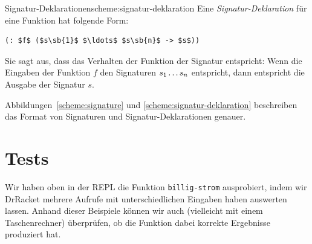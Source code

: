 \begin{feature}{Signatur-Deklarationen}{scheme:signatur-deklaration}
Eine \textit{Signatur-Deklaration} für
eine Funktion hat
folgende Form:
%
\begin{lstlisting}
(: $f$ ($s\sb{1}$ $\ldots$ $s\sb{n}$ -> $s$))
\end{lstlisting}
%
Sie sagt aus, dass das Verhalten der Funktion der Signatur entspricht:
Wenn die Eingaben der Funktion $f$ den Signaturen \(s\sb{1} \ldots
s\sb{n}\) entspricht, dann entspricht die Ausgabe der Signatur $s$.
\end{feature}
%
Abbildungen~\ref{scheme:signature} und
\ref{scheme:signatur-deklaration} beschreiben das Format von Signaturen
und Signatur-Deklarationen genauer.

\section{Tests}

Wir haben oben in der REPL die Funktion
\lstinline{billig-strom} ausprobiert, indem wir DrRacket mehrere Aufrufe
mit unterschiedlichen Eingaben haben auswerten lassen.  Anhand dieser
Beispiele können wir auch (vielleicht mit einem Taschenrechner)
überprüfen, ob die Funktion dabei korrekte Ergebnisse produziert hat.

